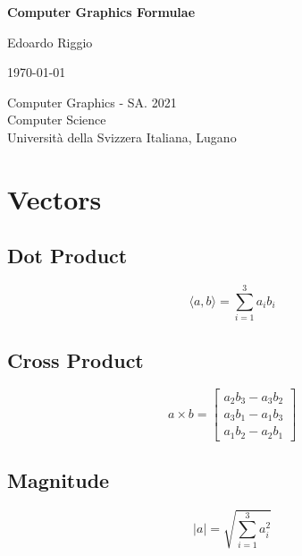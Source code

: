 \documentclass{article}
\begin{document}
\begin{titlepage}
    \begin{center}
        \vspace*{1cm}
        
        \Huge
        \textbf{Computer Graphics Formulae}
        
        \vspace{0.5cm}
        \LARGE
        
        \vspace{.5cm}
        
        Edoardo Riggio
   		  \vspace{1.5cm}
       
        \vfill
        
        \today
        
        \vspace{.8cm}
          \Large
          Computer Graphics - SA. 2021 \\
        Computer Science\\
        Universit\`{a} della Svizzera Italiana, Lugano\\
        
    \end{center}
\end{titlepage}

\tableofcontents

\newpage

\section{Vectors}
\subsection{Dot Product}
\vspace{.3cm}
\[ \langle a, b \rangle = \sum^3_{i=1} a_i b_i \]

\subsection{Cross Product}
\vspace{.3cm}
\[ a \times b = \begin{bmatrix} a_2b_3 - a_3b_2 \\ a_3b_1 - a_1b_3 \\ a_1b_2 - a_2b_1 \end{bmatrix} \]

\subsection{Magnitude}
\vspace{.3cm}
\[ |a| = \sqrt{\sum^3_{i=1} a_i^2} \]
\end{document}
